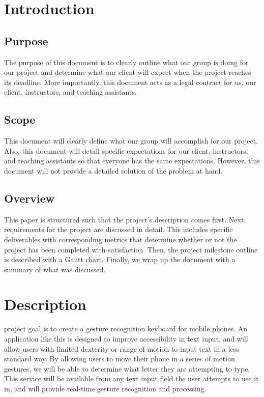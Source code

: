 \documentclass[onecolumn, draftclsnofoot,10pt, journal, letterpaper]{IEEEtran}
\begin{document}
\newpage
\section{Introduction}
    \subsection{Purpose}
        The purpose of this document is to clearly outline what our group is doing for our project and determine what our client will expect when the project reaches its deadline. More importantly, this document acts as a legal contract for us, our client, instructors, and teaching assistants. 
    \subsection{Scope}
        This document will clearly define what our group will accomplish for our project. Also, this document will detail specific expectations for our client, instructors, and teaching assistants so that everyone has the same expectations. However, this document will not provide a detailed solution of the problem at hand. 
    \subsection{Overview}
        This paper is structured such that the project's description comes first. Next, requirements for the project are discussed in detail. This includes specific deliverables with corresponding metrics that determine whether or not the project has been completed with satisfaction. Then, the project milestone outline is described with a Gantt chart. Finally, we wrap up the document with a summary of what was discussed. 

\section{Description}
    
      project goal is to create a gesture recognition keyboard for mobile phones. An application like this is designed to improve accessibility in text input, and will allow users with limited dexterity or range of motion to input text in a less standard way. By allowing users to move their phone in a series of motion gestures, we will be able to determine what letter they are attempting to type. This service will be available from any text input field the user attempts to use it in, and will provide real-time gesture recognition and processing.
    
\end{document}
